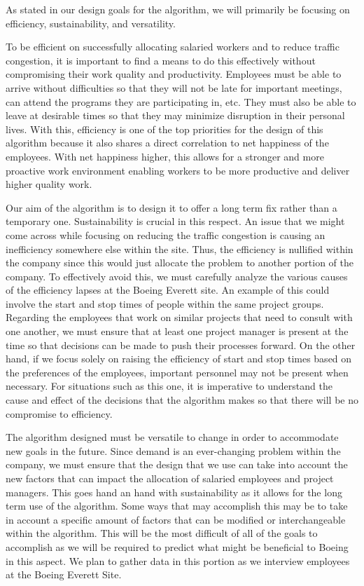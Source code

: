 \documentclass[a4,draftclsnofoot,onecolumn,margin=0.75,10pt]{IEEEtran}
\begin{document}
{\color{black}
As stated in our design goals for the algorithm, we will primarily be focusing on efficiency, sustainability, and versatility.

   To be efficient on successfully allocating salaried workers and to reduce traffic congestion, it is important to find a means to do this effectively without compromising their work quality and productivity. Employees must be able to arrive without difficulties so that they will not be late for important meetings, can attend the programs they are participating in, etc. They must also be able to leave at desirable times so that they may minimize disruption in their personal lives. With this, efficiency is one of the top priorities for the design of this algorithm because it also shares a direct correlation to net happiness of the employees. With net happiness higher, this allows for a stronger and more proactive work environment enabling workers to be more productive and deliver higher quality work.

   Our aim of the algorithm is to design it to offer a long term fix rather than a temporary one. Sustainability is crucial in this respect. An issue that we might come across while focusing on reducing the traffic congestion is causing an inefficiency somewhere else within the site. Thus, the efficiency is nullified within the company since this would just allocate the problem to another portion of the company. To effectively avoid this, we must carefully analyze the various causes of the efficiency lapses at the Boeing Everett site. An example of this could involve the start and stop times of people within the same project groups. Regarding the employees that work on similar projects that need to consult with one another, we must ensure that at least one project manager is present at the time so that decisions can be made to push their processes forward. On the other hand, if we focus solely on raising the efficiency of start and stop times based on the preferences of the employees, important personnel may not be present when necessary. For situations such as this one, it is imperative to understand the cause and effect of the decisions that the algorithm makes so that there will be no compromise to efficiency.

   The algorithm designed must be versatile to change in order to accommodate new goals in the future. Since demand is an ever-changing problem within the company, we must ensure that the design that we use can take into account the new factors that can impact the allocation of salaried employees and project managers. This goes hand an hand with sustainability as it allows for the long term use of the algorithm. Some ways that may accomplish this may be to take in account a specific amount of factors that can be modified or interchangeable within the algorithm. This will be the most difficult of all of the goals to accomplish as we will be required to predict what might be beneficial to Boeing in this aspect. We plan to gather data in this portion as we interview employees at the Boeing Everett Site.}
\end{document}
